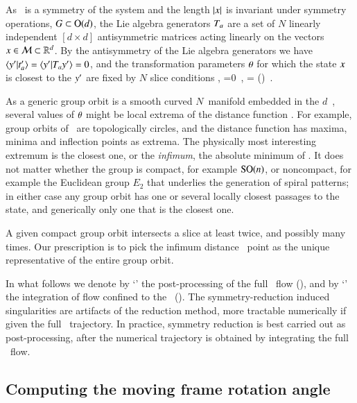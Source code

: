 As \Group\ is a symmetry of the system and the
length $|x|$ is invariant under symmetry operations, $G \subset \textrm{O}(d)$,
the Lie algebra {generators} $T_a$ are a set of $N$ linearly
independent $[d\!\times\!d]$ antisymmetric matrices acting linearly on
the {\statesp} vectors $x \in {\cal M} \subset \mathbb{R}^d$.
By the antisymmetry of the Lie algebra generators we have
$\braket{\slicep}{\sliceTan{a}}
 = \braket{\slicep}{\Lg_{a}\slicep}=0$, and the transformation parameters
${\bf \theta}$ for which the state $x$ is closest to the {\template}
${y'}$ are fixed by $N$ slice conditions ,
\beq
{} =0
    \,,\qquad
\sspRed = \LieEl(\gSpace) \ssp
\,.


As a generic group orbit is a smooth curved $N$\dmn\ manifold embedded in
the $d$\dmn\ \statesp, several values of ${\bf \theta}$ might be local extrema
of the distance function . For example, group orbits of
\ are topologically circles, and the distance function
 has maxima, minima and inflection points as extrema.
The physically most interesting extremum is the closest one, or the
\emph{infimum}, the absolute minimum of . It does not
matter whether the group is compact, for example $\textrm{SO}(n)$, or
noncompact, for example the Euclidean group $E_2$ that underlies the
generation of spiral patterns; in either case any group
orbit has one or several locally closest passages to the {\template}
state, and generically only one that is the closest one.

A given compact group orbit intersects a slice at least twice, and
possibly many times. Our prescription is to pick the infimum distance
\reducedsp\ point as the unique representative of the entire group orbit.

In what follows we denote by `\mframes' the post-processing of the full
\statesp\ flow (), and by `\mslices' the
integration of flow confined to the \reducedsp\ ().
 The symmetry-reduction induced singularities are
artifacts of the reduction method, more tractable numerically if given
the full \statesp\ trajectory.
In practice, symmetry reduction is best carried out as post-processing,
after the numerical trajectory is obtained by integrating the full
\statesp\ flow.

\subsection{Computing the moving frame rotation angle}
\label{exam:CLErotAngle}

